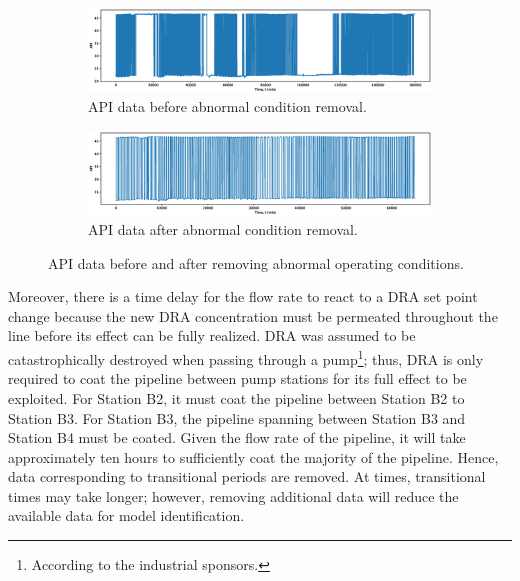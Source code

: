\begin{figure}[h]
     \centering
     \begin{subfigure}[b]{1.0\textwidth}
         \centering
         \includegraphics[width=\textwidth]{images/suncor/08NonFilteredDensity.eps}
         \caption{API data before abnormal condition removal.}
         \label{fig:08APIBefore}
     \end{subfigure}
     \hfill
     \begin{subfigure}[b]{1.0\textwidth}
         \centering
         \includegraphics[width=\textwidth]{images/suncor/08FilteredDensity.eps}
         \caption{API data after abnormal condition removal.}
         \label{fig:08APIAfter}
     \end{subfigure}
        \caption{API data before and after removing abnormal operating conditions.}
        \label{fig:08API}
\end{figure}

Moreover, there is a time delay for the flow rate to react to a DRA set point change because the new DRA concentration must be permeated throughout the line before its effect can be fully realized.  DRA was assumed to be catastrophically destroyed when passing through a pump\footnote{According to the industrial sponsors.}; thus, DRA is only required to coat the pipeline between pump stations for its full effect to be exploited.  For Station B2, it must coat the pipeline between Station B2 to Station B3.  For Station B3, the pipeline spanning between Station B3 and Station B4 must be coated.  Given the flow rate of the pipeline, it will take approximately ten hours to sufficiently coat the majority of the pipeline. Hence, data corresponding to transitional periods are removed. At times, transitional times may take longer; however, removing additional data will reduce the available data for model identification.  

